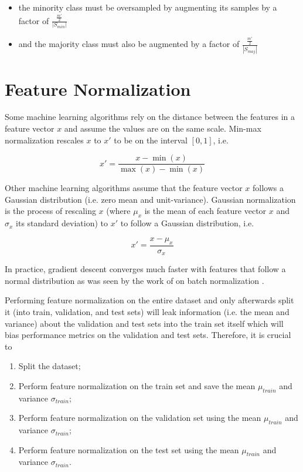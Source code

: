 \begin{itemize}
    \item the minority class must be oversampled by augmenting its samples  by a factor of $\frac{\frac{m'}{2}}{|S_{min}|}$
    \item and the majority class must also be augmented by a factor of $\frac{\frac{m'}{2}}{|S_{maj}|}$
\end{itemize}

\section{Feature Normalization}

Some machine learning algorithms rely on the distance between the features in a feature vector $x$ and assume the values are on the same scale. Min-max normalization rescales $x$ to $x'$ to be on the interval $[0, 1]$, i.e.

$$
x' = \frac{x - \min{(x)}}{\max{(x)} - \min{(x)}}
$$

Other machine learning algorithms assume that the feature vector $x$ follows a Gaussian distribution (i.e. zero mean and unit-variance). Gaussian normalization is the process of rescaling $x$ (where $\mu_x$ is the mean of each feature vector $x$ and $\sigma_x$ its standard deviation) to $x'$ to follow a Gaussian distribution, i.e.

$$
x' = \frac{x - \mu_x}{\sigma_x}
$$

In practice, gradient descent converges much faster with features that follow a normal distribution as was seen by the work of \citeauthor{batchnormalization} on batch normalization \cite{batchnormalization}.

Performing feature normalization on the entire dataset and only afterwards split it (into train, validation, and test sets) will leak information (i.e. the mean and variance) about the validation and test sets into the train set itself which will bias performance metrics on the validation and test sets. Therefore, it is crucial to

\begin{enumerate}
    \item Split the dataset;
    \item Perform feature normalization on the train set and save the mean $\mu_{train}$ and variance $\sigma_{train}$;
    \item Perform feature normalization on the validation set using the mean $\mu_{train}$ and variance $\sigma_{train}$;
    \item Perform feature normalization on the test set using the mean $\mu_{train}$ and variance $\sigma_{train}$.
\end{enumerate}

